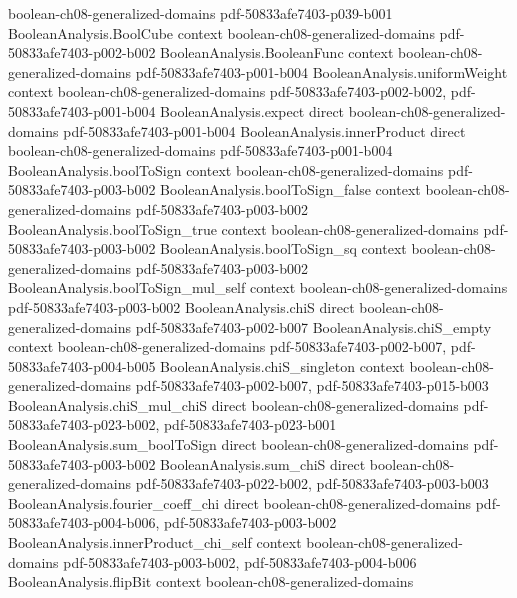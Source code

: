 \begin{lemma}
  {boolean-ch08-generalized-domains}
  {pdf-50833afe7403-p039-b001}
\proofstep
  {BooleanAnalysis.BoolCube}
  {context}
  {boolean-ch08-generalized-domains}
  {pdf-50833afe7403-p002-b002}
\proofstep
  {BooleanAnalysis.BooleanFunc}
  {context}
  {boolean-ch08-generalized-domains}
  {pdf-50833afe7403-p001-b004}
\proofstep
  {BooleanAnalysis.uniformWeight}
  {context}
  {boolean-ch08-generalized-domains}
  {pdf-50833afe7403-p002-b002,
    pdf-50833afe7403-p001-b004}
\proofstep
  {BooleanAnalysis.expect}
  {direct}
  {boolean-ch08-generalized-domains}
  {pdf-50833afe7403-p001-b004}
\proofstep
  {BooleanAnalysis.innerProduct}
  {direct}
  {boolean-ch08-generalized-domains}
  {pdf-50833afe7403-p001-b004}
\proofstep
  {BooleanAnalysis.boolToSign}
  {context}
  {boolean-ch08-generalized-domains}
  {pdf-50833afe7403-p003-b002}
\proofstep
  {BooleanAnalysis.boolToSign_false}
  {context}
  {boolean-ch08-generalized-domains}
  {pdf-50833afe7403-p003-b002}
\proofstep
  {BooleanAnalysis.boolToSign_true}
  {context}
  {boolean-ch08-generalized-domains}
  {pdf-50833afe7403-p003-b002}
\proofstep
  {BooleanAnalysis.boolToSign_sq}
  {context}
  {boolean-ch08-generalized-domains}
  {pdf-50833afe7403-p003-b002}
\proofstep
  {BooleanAnalysis.boolToSign_mul_self}
  {context}
  {boolean-ch08-generalized-domains}
  {pdf-50833afe7403-p003-b002}
\proofstep
  {BooleanAnalysis.chiS}
  {direct}
  {boolean-ch08-generalized-domains}
  {pdf-50833afe7403-p002-b007}
\proofstep
  {BooleanAnalysis.chiS_empty}
  {context}
  {boolean-ch08-generalized-domains}
  {pdf-50833afe7403-p002-b007,
    pdf-50833afe7403-p004-b005}
\proofstep
  {BooleanAnalysis.chiS_singleton}
  {context}
  {boolean-ch08-generalized-domains}
  {pdf-50833afe7403-p002-b007,
    pdf-50833afe7403-p015-b003}
\proofstep
  {BooleanAnalysis.chiS_mul_chiS}
  {direct}
  {boolean-ch08-generalized-domains}
  {pdf-50833afe7403-p023-b002,
    pdf-50833afe7403-p023-b001}
\proofstep
  {BooleanAnalysis.sum_boolToSign}
  {direct}
  {boolean-ch08-generalized-domains}
  {pdf-50833afe7403-p003-b002}
\proofstep
  {BooleanAnalysis.sum_chiS}
  {direct}
  {boolean-ch08-generalized-domains}
  {pdf-50833afe7403-p022-b002,
    pdf-50833afe7403-p003-b003}
\proofstep
  {BooleanAnalysis.fourier_coeff_chi}
  {direct}
  {boolean-ch08-generalized-domains}
  {pdf-50833afe7403-p004-b006,
    pdf-50833afe7403-p003-b002}
\proofstep
  {BooleanAnalysis.innerProduct_chi_self}
  {context}
  {boolean-ch08-generalized-domains}
  {pdf-50833afe7403-p003-b002,
    pdf-50833afe7403-p004-b006}
\proofstep
  {BooleanAnalysis.flipBit}
  {context}
  {boolean-ch08-generalized-domains}

\end{lemma}
